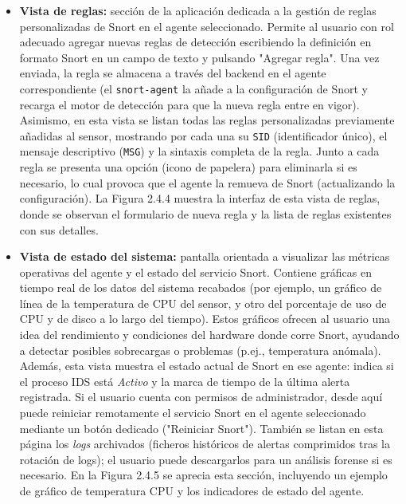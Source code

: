 \documentclass[11pt,a4paper,twoside]{report}
\begin{document}
\begin{itemize}
	\item \textbf{Vista de reglas:} sección de la aplicación dedicada a la gestión de reglas personalizadas de Snort en el agente seleccionado. Permite al usuario con rol adecuado agregar nuevas reglas de detección escribiendo la definición en formato Snort en un campo de texto y pulsando "Agregar regla". Una vez enviada, la regla se almacena a través del backend en el agente correspondiente (el \texttt{snort-agent} la añade a la configuración de Snort y recarga el motor de detección para que la nueva regla entre en vigor). Asimismo, en esta vista se listan todas las reglas personalizadas previamente añadidas al sensor, mostrando por cada una su \texttt{SID} (identificador único), el mensaje descriptivo (\texttt{MSG}) y la sintaxis completa de la regla. Junto a cada regla se presenta una opción (icono de papelera) para eliminarla si es necesario, lo cual provoca que el agente la remueva de Snort (actualizando la configuración). La Figura 2.4.4 muestra la interfaz de esta vista de reglas, donde se observan el formulario de nueva regla y la lista de reglas existentes con sus detalles.
	
	\item \textbf{Vista de estado del sistema:} pantalla orientada a visualizar las métricas operativas del agente y el estado del servicio Snort. Contiene gráficas en tiempo real de los datos del sistema recabados (por ejemplo, un gráfico de línea de la temperatura de CPU del sensor, y otro del porcentaje de uso de CPU y de disco a lo largo del tiempo). Estos gráficos ofrecen al usuario una idea del rendimiento y condiciones del hardware donde corre Snort, ayudando a detectar posibles sobrecargas o problemas (p.ej., temperatura anómala). Además, esta vista muestra el estado actual de Snort en ese agente: indica si el proceso IDS está \emph{Activo} y la marca de tiempo de la última alerta registrada. Si el usuario cuenta con permisos de administrador, desde aquí puede reiniciar remotamente el servicio Snort en el agente seleccionado mediante un botón dedicado ("Reiniciar Snort"). También se listan en esta página los \emph{logs} archivados (ficheros históricos de alertas comprimidos tras la rotación de logs); el usuario puede descargarlos para un análisis forense si es necesario. En la Figura 2.4.5 se aprecia esta sección, incluyendo un ejemplo de gráfico de temperatura CPU y los indicadores de estado del agente.
	

\end{itemize}
\end{document}

